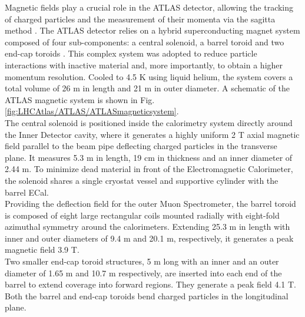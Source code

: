 \noindent Magnetic fields play a crucial role in the ATLAS detector, allowing the tracking of charged particles and the measurement of their momenta via the sagitta method \cite{Sagitta_method}.
The ATLAS detector relies on a hybrid superconducting magnet system composed of four sub-components: a central solenoid, a barrel toroid and two end-cap toroids \cite{ATLAS_exp_2008}.
This complex system was adopted to reduce particle interactions with inactive material and, more importantly, to obtain a higher momentum resolution.
Cooled to 4.5 K using liquid helium, the system covers a total volume of 26 m in length and 21 m in outer diameter.
A schematic of the ATLAS magnetic system is shown in Fig. \ref{fig:LHCAtlas/ATLAS/ATLASmagneticsystem}.\\
The central solenoid is positioned inside the calorimetry system directly around the Inner Detector cavity, where it generates a highly uniform 2 T axial magnetic field parallel to the beam pipe deflecting charged particles in the transverse plane. It measures 5.3 m in length, 19 cm in thickness and an inner diameter of 2.44 m.
To minimize dead material in front of the Electromagnetic Calorimeter, the solenoid shares a single cryostat vessel and supportive cylinder with the barrel ECal.\\
Providing the deflection field for the outer Muon Spectrometer, the barrel toroid is composed of eight large rectangular coils mounted radially with eight-fold azimuthal symmetry around the calorimeters. 
Extending 25.3 m in length with inner and outer diameters of 9.4 m and 20.1 m, respectively, it generates a peak magnetic field 3.9 T.\\
Two smaller end-cap toroid structures, 5 m long with an inner and an outer diameter of 1.65 m  and 10.7 m respectively, are inserted into each end of the barrel to extend coverage into forward regions. They generate a peak field 4.1 T. Both the barrel and end-cap toroids bend charged particles in the longitudinal plane.
